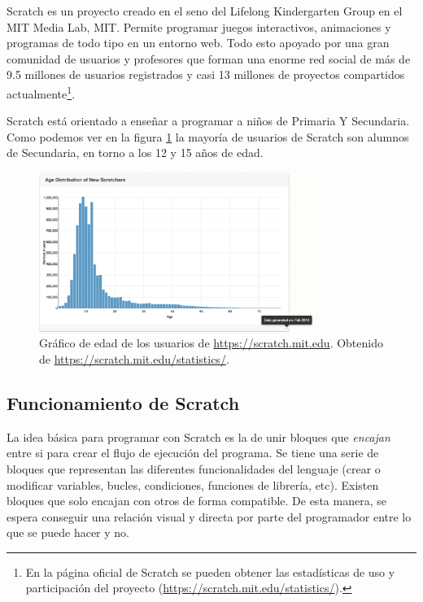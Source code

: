 Scratch\cite{scratch} es un proyecto creado en el seno del Lifelong Kindergarten Group en el MIT Media Lab, \acrfull{MIT}. Permite programar juegos interactivos, animaciones y programas de todo tipo en un entorno web. Todo esto apoyado por una gran comunidad de usuarios y profesores que forman una enorme red social de más de 9.5 millones de usuarios registrados y casi 13 millones de proyectos compartidos actualmente\footnote{En la página oficial de Scratch se pueden obtener las estadísticas de uso y participación del proyecto (\url{https://scratch.mit.edu/statistics/}).}.

Scratch está orientado a enseñar a programar a niños de Primaria Y Secundaria. Como podemos ver en la figura \ref{fig:scratch-edad} la mayoría de usuarios de Scratch son alumnos de Secundaria, en torno a los 12 y 15 años de edad.

\begin{figure}[!ht]
	\begin{centering}
		\includegraphics[width=0.8\textwidth]{images/scratch-edad.png}
			\caption{Gráfico de edad de los usuarios de \url{https://scratch.mit.edu}. Obtenido de \url{https://scratch.mit.edu/statistics/}.}
				\label{fig:scratch-edad}
	\end{centering}
\end{figure}


\subsection{Funcionamiento de Scratch}
\label{sec:scratch-funcionamiento}

La idea básica para programar con Scratch es la de unir bloques que \emph{encajan} entre si para crear el flujo de ejecución del programa. Se tiene una serie de bloques que representan las diferentes funcionalidades del lenguaje (crear o modificar variables, bucles, condiciones, funciones de librería, etc). Existen bloques que solo encajan con otros de forma compatible. De esta manera, se espera conseguir una relación visual y directa por parte del programador entre lo que se puede hacer y no. 


